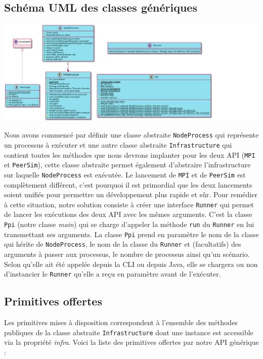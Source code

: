 \documentclass{article}
\begin{document}
				\subsection{Schéma UML des classes génériques}
					\vspace{5mm}
					\hspace*{-1cm} \includegraphics[width=22cm]{uml/generique.png}
					
					\vspace{10mm}
					Nous avons commencé par définir une classe abstraite \verb|NodeProcess| qui représente un processus à exécuter et une autre classe abstraite \verb|Infrastructure| qui contient toutes les méthodes que nous devrons implanter pour les deux API (\verb|MPI| et \verb|PeerSim|), cette classe abstraite permet également d'abstraire l'infrastructure sur laquelle \verb|NodeProcess| est exécutée.
					\newline
					\newline
					Le lancement de \verb|MPI| et de \verb|PeerSim| est complètement différent, c’est pourquoi il est primordial que les deux lancements soient unifiés pour permettre un développement plus rapide et sûr. 
					\newline
					Pour remédier à cette situation, notre solution consiste à créer une interface \verb|Runner| qui permet de lancer les exécutions des deux API avec les mêmes arguments. C'est la classe \verb|Ppi|
					(notre classe \emph{main}) qui se charge d'appeler la méthode \verb|run| du
					\verb|Runner| en lui transmettant ses arguments. La classe \verb|Ppi| prend en
					paramètre le nom de la classe qui hérite de \verb|NodeProcess|, le nom de la classe
					du \verb|Runner| et (facultatifs) des arguments à passer aux processus,
					le nombre de processus ainsi qu’un scénario.
					Selon qu'elle ait été appelée depuis la CLI ou depuis Java, elle se chargera ou
					non d'instancier le \verb|Runner| qu'elle a reçu en paramètre avant de l'exécuter.

					\newpage
					\subsection{Primitives offertes}
					Les primitives mises à disposition correspondent à l'ensemble des méthodes publiques de la classe abstraite \verb|Infrastructure| dont une instance est accessible via la propriété \emph{infra}.
					\newline
					Voici la liste des primitives offertes par notre API générique : 
					\newline
					
\end{document}
